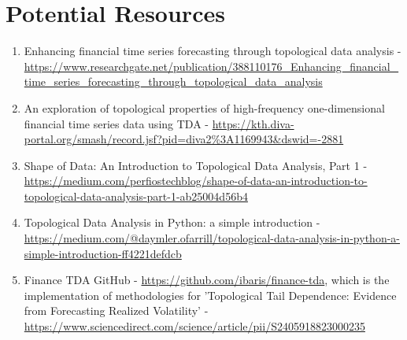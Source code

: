 \documentclass{article}
\begin{document}
        \section*{Potential Resources} 
        \begin{enumerate}
        \item Enhancing financial time series forecasting through topological data analysis - \url{https://www.researchgate.net/publication/388110176_Enhancing_financial_time_series_forecasting_through_topological_data_analysis}
        \item An exploration of topological properties of high-frequency one-dimensional financial time series data using TDA - \url{https://kth.diva-portal.org/smash/record.jsf?pid=diva2%3A1169943&dswid=-2881}
        \item Shape of Data: An Introduction to Topological Data Analysis, Part 1 - \url{https://medium.com/perfiostechblog/shape-of-data-an-introduction-to-topological-data-analysis-part-1-ab25004d56b4}
        \item Topological Data Analysis in Python: a simple introduction - \url{https://medium.com/@daymler.ofarrill/topological-data-analysis-in-python-a-simple-introduction-ff4221defdcb}
        \item Finance TDA GitHub - \url{https://github.com/ibaris/finance-tda}, which is the implementation of methodologies for 'Topological Tail Dependence: Evidence from Forecasting Realized Volatility' -  \url{https://www.sciencedirect.com/science/article/pii/S2405918823000235}
        \end{enumerate}
        
        
\end{document}
